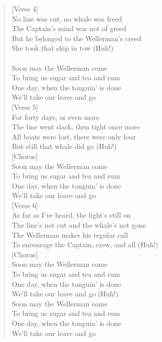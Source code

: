\documentclass[11pt]{article}
\begin{document}
\begin{verse}
\vspace*{1em}
[Verse 4]\\
No line was cut, no whale was freed\\
The Captain's mind was not of greed\\
But he belonged to the Wellerman's creed\\
She took that ship in tow (Huh!)\\
[Chorus]\\
Soon may the Wellerman come\\
To bring us sugar and tea and rum\\
One day, when the tonguin' is done\\
We'll take our leave and go\\
\vspace*{1em}
[Verse 5]\\
For forty days, or even more\\
The line went slack, then tight once more\\
All boats were lost, there were only four\\
But still that whale did go (Huh!)\\
\vspace*{1em}
[Chorus]\\
Soon may the Wellerman come\\
To bring us sugar and tea and rum\\
One day, when the tonguin' is done\\
We'll take our leave and go\\
\vspace*{1em}
[Verse 6]\\
As far as I've heard, the fight's still on\\
The line's not cut and the whale's not gone\\
The Wellerman makes his regular call\\
To encourage the Captain, crew, and all (Huh!)\\
\vspace*{1em}
[Chorus]\\
Soon may the Wellerman come\\
To bring us sugar and tea and rum\\
One day, when the tonguin' is done\\
We'll take our leave and go (Huh!)\\
Soon may the Wellerman come\\
To bring us sugar and tea and rum\\
One day, when the tonguin' is done\\
We'll take our leave and go\\
\end{verse}

\clearpage
\end{document}

